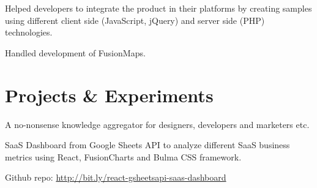\documentclass[]{gagan-resume}
\begin{document}
\begin{minipage}[t]{0.65\textwidth}
\vspace{\topsep}
\begin{tightemize}
\item Helped developers to integrate the product in their platforms by creating samples using different client side (JavaScript, jQuery) and server side (PHP) technologies.
\item Handled development of FusionMaps.
\end{tightemize}
\sectionsep



\section{Projects \& Experiments}
 
\vspace{\topsep}
\begin{tightemize}
\item A no-nonsense knowledge aggregator for designers, developers and marketers etc.
\end{tightemize}
\sectionsep

\vspace{\topsep}
\begin{tightemize}
\item SaaS Dashboard from Google Sheets API to analyze different SaaS business metrics using React, FusionCharts and Bulma CSS framework.
\item Github repo: \href{http://bit.ly/react-gsheetsapi-saas-dashboard}{http://bit.ly/react-gsheetsapi-saas-dashboard}
\end{tightemize}
\sectionsep


\end{minipage} 
\end{document}
